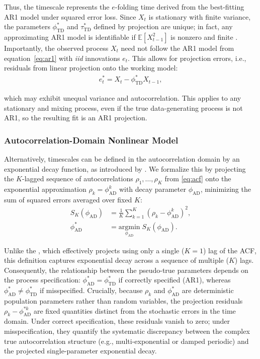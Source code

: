 \documentclass[9pt]{article}
\newcommand{\phitd}{\phi_{\scriptscriptstyle\text{TD}}}
\newcommand{\tautd}{\tau_{\scriptscriptstyle\text{TD}}}
\newcommand{\phiad}{\phi_{\scriptscriptstyle\text{AD}}}
\begin{document}
\noindent Thus, the timescale represents the $e$-folding time derived from the best-fitting AR1 model under squared error loss. Since $X_t$ is stationary with finite variance, the parameters $\phitd^*$ and $\tautd^*$ defined by projection are unique; in fact, any approximating AR1 model is identifiable if $\mathbb{E}[X_{t-1}^2]$ is nonzero and finite \citep[Theorem~14.28]{hansen_econometrics_2022}. Importantly, the observed process $X_t$ need not follow the AR1 model from equation~\eqref{eq:ar1} with \textit{iid} innovations $e_t$. This allows for projection errors, i.e., residuals from linear projection onto the working model:
\begin{align}
    e_t^* = X_t - \phitd^* X_{t-1},
\end{align}

\noindent which may exhibit unequal variance and autocorrelation. This applies to any stationary and mixing process, even if the true data-generating process is not AR1, so the resulting fit is an AR1 projection.

\subsubsection{Autocorrelation-Domain Nonlinear Model}\label{sec:autocorrelation-domain-nonlinear-model}

Alternatively, timescales can be defined in the autocorrelation domain by an exponential decay function, as introduced by \citet{murray_hierarchy_2014}. We formalize this by projecting the $K$-lagged sequence of autocorrelations $\rho_1, \dots, \rho_K$ from \eqref{eq:acf} onto the exponential approximation $\rho_k = \phiad^k$ with decay parameter $\phiad$, minimizing the sum of squared errors averaged over fixed $K$:
\begin{align}
    S_K(\phiad) &= \frac{1}{K} \sum_{k=1}^K \left( \rho_k - \phiad^k \right)^2, \label{eq:nlm_loss} \\
    \phiad^* &= \underset{\phiad}{\text{argmin}} \; S_K(\phiad). \label{eq:nlm_phi}
\end{align}

Unlike the , which effectively projects using only a single ($K=1$) lag of the ACF, this definition captures exponential decay across a sequence of multiple ($K$) lags. Consequently, the relationship between the pseudo-true parameters depends on the process specification: $\phiad^* = \phitd^*$ if correctly specified (AR1), whereas $\phiad^* \ne \phitd^*$ if misspecified. Crucially, because $\rho_k$ and $\phiad^*$ are deterministic population parameters rather than random variables, the projection residuals $\rho_k - \phiad^{*k}$ are fixed quantities distinct from the stochastic errors in the time domain. Under correct specification, these residuals vanish to zero; under misspecification, they quantify the systematic discrepancy between the complex true autocorrelation structure (e.g., multi-exponential or damped periodic) and the projected single-parameter exponential decay.\\
\end{document}
